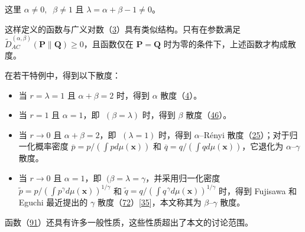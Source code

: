 这里 \(\alpha \neq 0,\;\;\beta \neq 1\) 且 \(\lambda = \alpha + \beta - 1 \neq 0\)。


这样定义的函数与广义对数（\hyperref[FD3-entropy-12-01532]{3}）具有类似结构。只有在参数满足 \({\widetilde{D}}_{AC}^{(\alpha,\beta)}{(\mathbf{P} \parallel \mathbf{Q})} \geq 0\)，且函数仅在 \(\mathbf{P} = \mathbf{Q}\) 时为零的条件下，上述函数才构成散度。


在若干特例中，得到以下散度：

\begin{itemize}
\item 当 \(r = \lambda = 1\) 且 \(\alpha + \beta = 2\) 时，得到 \(\alpha\) 散度（\hyperref[FD4-entropy-12-01532]{4}）。


\item 当 \(r = 1\) 且 \(\alpha = 1\)，即 \(\;(\beta = \lambda)\) 时，得到 \(\beta\) 散度（\hyperref[FD47-entropy-12-01532]{46}）。


\item 当 \(\left. r\rightarrow 0 \right.\) 且 \(\alpha + \beta = 2\)，即 \(\;(\lambda = 1)\) 时，得到 \(\alpha\)–Rényi 散度（\hyperref[FD25-entropy-12-01532]{25}）；对于归一化概率密度 \(\overline{p} = p/{(\int pd\mu{(\mathbf{x})})}\) 和 \(\overline{q} = q/{(\int qd\mu{(\mathbf{x})})}\)，它退化为 \(\alpha\)–\(\gamma\) 散度。


\item 当 \(\left. r\rightarrow 0 \right.\) 且 \(\alpha = 1\)，即 \(\;(\beta = \lambda = \gamma\)，并采用归一化密度 \(\widetilde{p} = p/{(\int p^{\gamma}d\mu{(\mathbf{x})})}^{1/\gamma}\) 和 \(\widetilde{q} = q/{(\int q^{\,\gamma}d\mu{(\mathbf{x})})}^{1/\gamma}\) 时，得到 Fujisawa 和 Eguchi 最近提出的 \(\gamma\) 散度（\hyperref[FD74-entropy-12-01532]{72}）[\hyperlink{B35-entropy-12-01532}{35}]，本文称其为 \(\beta\)–\(\gamma\) 散度。

\end{itemize}





函数（\hyperref[FD98-entropy-12-01532]{91}）还具有许多一般性质，这些性质超出了本文的讨论范围。
